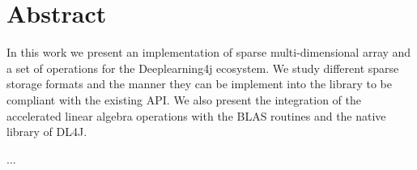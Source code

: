 

\cleardoublepage
\chapter*{Abstract}
In this work we present an implementation of sparse multi-dimensional array and a set of operations for the Deeplearning4j ecosystem. We study different sparse storage formats and the manner they can be implement into the library to be compliant with the existing API. We also present the integration of the accelerated linear algebra operations with the BLAS routines and the native library of DL4J.

...

\vskip0.5cm





